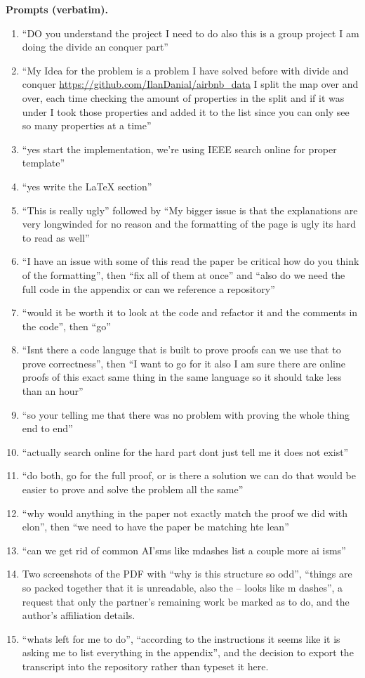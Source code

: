\textbf{Prompts (verbatim).}
\begin{enumerate}
\item ``DO you understand the project I need to do also this is a group project
  I am doing the divide an conquer part''
\item ``My Idea for the problem is a problem I have solved before with divide
  and conquer \url{https://github.com/IlanDanial/airbnb_data} I split the map over and
  over, each time checking the amount of properties in the split and if it was
  under I took those properties and added it to the list since you can only see
  so many properties at a time''
\item ``yes start the implementation, we're using IEEE search online for proper
  template''
\item ``yes write the LaTeX section''
\item ``This is really ugly'' followed by ``My bigger issue is that the
  explanations are very longwinded for no reason and the formatting of the
  page is ugly its hard to read as well''
\item ``I have an issue with some of this read the paper be critical how do
  you think of the formatting'', then ``fix all of them at once'' and ``also
  do we need the full code in the appendix or can we reference a repository''
\item ``would it be worth it to look at the code and refactor it and the
  comments in the code'', then ``go''
\item ``Isnt there a code languge that is built to prove proofs can we use
  that to prove correctness'', then ``I want to go for it also I am sure there
  are online proofs of this exact same thing in the same language so it should
  take less than an hour''
\item ``so your telling me that there was no problem with proving the whole
  thing end to end''
\item ``actually search online for the hard part dont just tell me it does
  not exist''
\item ``do both, go for the full proof, or is there a solution we can do that
  would be easier to prove and solve the problem all the same''
\item ``why would anything in the paper not exactly match the proof we did
  with elon'', then ``we need to have the paper be matching hte lean''
\item ``can we get rid of common AI'sms like mdashes list a couple more ai
  isms''
\item Two screenshots of the PDF with ``why is this structure so odd'',
  ``things are so packed together that it is unreadable, also the -- looks
  like m dashes'', a request that only the partner's remaining work be marked
  as to do, and the author's affiliation details.
\item ``whats left for me to do'', ``according to the instructions it seems
  like it is asking me to list everything in the appendix'', and the decision
  to export the transcript into the repository rather than typeset it here.
\end{enumerate}

